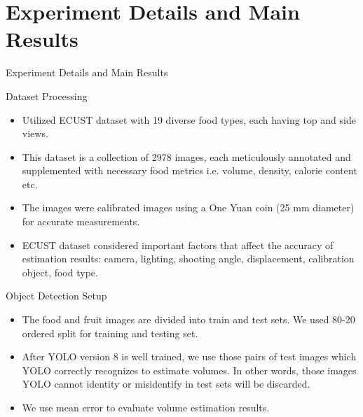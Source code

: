 \documentclass{beamer}
\begin{document}
	\section{Experiment Details and Main Results}
	\begin{frame}{Experiment Details and Main Results}
		\begin{block}{Dataset Processing}\scriptsize
			\begin{itemize}
				\item Utilized ECUST dataset with 19 diverse food types, each having top and side views.
				\item This dataset is a collection of 2978 images, each meticulously annotated and supplemented with necessary food metrics i.e. volume, density, calorie content etc.
				\item The images were calibrated images using a One Yuan coin (25 mm diameter) for accurate measurements.
				\item ECUST dataset considered important factors that affect the accuracy of estimation results: camera, lighting, shooting angle, displacement, calibration object, food type.
			\end{itemize}
		\end{block}\pause
		\begin{block}{Object Detection Setup}
			\begin{itemize}\scriptsize
				\item The food and fruit images are divided into train and test sets. We used 80-20 ordered split for training and testing set. 
				\item After YOLO version 8 is well trained, we use those pairs of test images which YOLO correctly recognizes to estimate volumes. In other words, those images YOLO cannot identity or misidentify in test sets will be discarded.
				\item We use mean error to evaluate volume estimation results.
			\end{itemize}
		\end{block}
	\end{frame}
	
\end{document}
